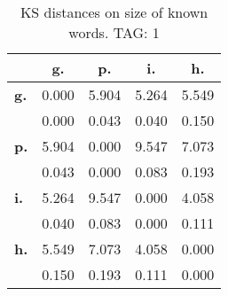 \begin{table}[h!]
\begin{center}
\begin{tabular}{| l || c | c | c | c |}\hline
 & {\bf g.} & {\bf p.} & {\bf i.} & {\bf h.} \\\hline\hline
{\bf g.} & 0.000 & 5.904 & 5.264 & 5.549 \\
{\bf } & 0.000 & 0.043 & 0.040 & 0.150 \\\hline
{\bf p.} & 5.904 & 0.000 & 9.547 & 7.073 \\
{\bf } & 0.043 & 0.000 & 0.083 & 0.193 \\\hline
{\bf i.} & 5.264 & 9.547 & 0.000 & 4.058 \\
{\bf } & 0.040 & 0.083 & 0.000 & 0.111 \\\hline
{\bf h.} & 5.549 & 7.073 & 4.058 & 0.000 \\
{\bf } & 0.150 & 0.193 & 0.111 & 0.000 \\\hline
\end{tabular}
\caption{KS distances on size of known words. TAG: 1}
\end{center}
\end{table}